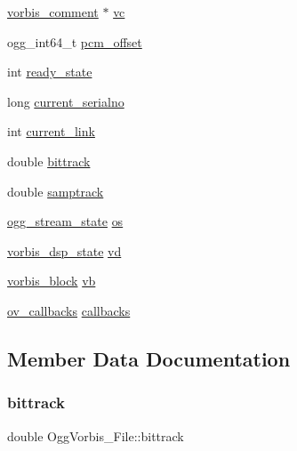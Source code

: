 \begin{DoxyCompactItemize}
\mbox{\hyperlink{structvorbis__comment}{vorbis\+\_\+comment}} $\ast$ \mbox{\hyperlink{struct_ogg_vorbis___file_a4467850c72aed93fe0a70e8f1fd6f20e}{vc}}
\item 
ogg\+\_\+int64\+\_\+t \mbox{\hyperlink{struct_ogg_vorbis___file_a23d5ba7ca52640ceb6f633a46304cdc5}{pcm\+\_\+offset}}
\item 
int \mbox{\hyperlink{struct_ogg_vorbis___file_ad304fe18bebc075c34f2e5ec7d1f2a99}{ready\+\_\+state}}
\item 
long \mbox{\hyperlink{struct_ogg_vorbis___file_ad7545f86b92a6d66641f3d04a2497763}{current\+\_\+serialno}}
\item 
int \mbox{\hyperlink{struct_ogg_vorbis___file_a9b2d64c3739364ac4c08070aac2e0588}{current\+\_\+link}}
\item 
double \mbox{\hyperlink{struct_ogg_vorbis___file_aa72a11d9f154636d4dc9edac4c9eb843}{bittrack}}
\item 
double \mbox{\hyperlink{struct_ogg_vorbis___file_a3fcbfeaad027ada99496dfcaf94866a9}{samptrack}}
\item 
\mbox{\hyperlink{structogg__stream__state}{ogg\+\_\+stream\+\_\+state}} \mbox{\hyperlink{struct_ogg_vorbis___file_a8658f17a6f662a74f8763c47d560d712}{os}}
\item 
\mbox{\hyperlink{structvorbis__dsp__state}{vorbis\+\_\+dsp\+\_\+state}} \mbox{\hyperlink{struct_ogg_vorbis___file_acb9d38719f54642d1a39f24203b466d6}{vd}}
\item 
\mbox{\hyperlink{structvorbis__block}{vorbis\+\_\+block}} \mbox{\hyperlink{struct_ogg_vorbis___file_a3201599977a781b7bf559167cd892638}{vb}}
\item 
\mbox{\hyperlink{structov__callbacks}{ov\+\_\+callbacks}} \mbox{\hyperlink{struct_ogg_vorbis___file_afb1474e24193f577dd21395a76199415}{callbacks}}
\end{DoxyCompactItemize}


\subsection{Member Data Documentation}
\mbox{\label{struct_ogg_vorbis___file_aa72a11d9f154636d4dc9edac4c9eb843}} 
\subsubsection{\texorpdfstring{bittrack}{bittrack}}
{\footnotesize\ttfamily double Ogg\+Vorbis\+\_\+\+File\+::bittrack}


